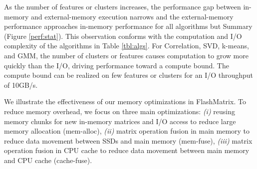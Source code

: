 As the number of features or clusters increases,
the performance gap between in-memory and external-memory execution
narrows and the external-memory performance approaches 
in-memory performance for all algorithms but Summary (Figure \ref{perf:stat}).
This observation conforms with the computation and I/O complexity of
the algorithms in Table \ref{tbl:algs}.
For Correlation, SVD, k-means, and GMM, the number of clusters or features causes computation
to grow more quickly than the I/O, driving performance toward a compute bound.
The compute bound can be realized on few features or clusters for an I/O throughput of 10GB/s.


We illustrate the effectiveness of our memory
optimizations in FlashMatrix. To reduce memory overhead, we focus on three
main optimizations: \textit{(i)} reusing memory chunks for new in-memory
matrices and I/O access to reduce large memory allocation (mem-alloc),
\textit{(ii)} matrix operation fusion in main memory to reduce data movement
between SSDs and main memory (mem-fuse), \textit{(iii)} matrix operation
fusion in CPU cache to reduce data movement between main memory and CPU cache
(cache-fuse).

